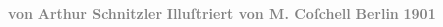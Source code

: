 \begin{ledgroupsized}[t]{13cm}
           \pstart
           \noindent{}\centering{}\textcolor{gray}{\textbf{von}}\pend
           \pstart
           \noindent{}\centering{}\textcolor{gray}{\textbf{Arthur Schnitzler}}\pend
           \pstart
           \noindent{}\centering{}\textcolor{gray}{\textbf{Illuſtriert von M. Coſchell}}\pend
           {\bigskip}\pstart
           \noindent{}\centering{}\textcolor{gray}{\textbf{\textbf{Berlin}}}\pend
           \pstart
           \noindent{}\centering{}\textcolor{gray}{\textbf{}}\pend
           \pstart
           \noindent{}\centering{}\textcolor{gray}{\textbf{1901}}\pend
                     \endnumbering{}\end{ledgroupsized}  \newcommand{\dateiname}{L01122}\newcommand{\titel}{Arthur Schnitzler: Widmungsexemplar Lieutenant Gustl für Hermann Bahr, [20.?] 5. 1901}\newcommand{\editorInnen}{ Kurt Ifkovits,  Martin Anton Müller}
            \footnotesize
\begin{ledgroupsized}[t]{11.5cm}
\end{ledgroupsized}
         
      
